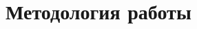 \documentclass[../document.tex]{subfiles}
\begin{document}
\section{Методология работы}



\end{document}
